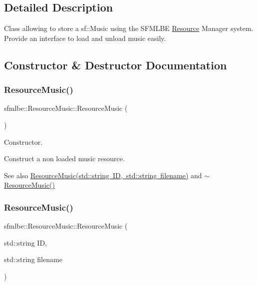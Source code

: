 \subsection{Detailed Description}
Class allowing to store a sf\+::\+Music using the S\+F\+M\+L\+BE \mbox{\hyperlink{classsfmlbe_1_1_resource}{Resource}} Manager system. Provide an interface to load and unload music easily. 

\subsection{Constructor \& Destructor Documentation}
\mbox{\label{classsfmlbe_1_1_resource_music_a9a20ebb5669632cbc4d85afb6ecf8848}} 
\subsubsection{\texorpdfstring{Resource\+Music()}{ResourceMusic()}\hspace{0.1cm}{\footnotesize\ttfamily [1/2]}}
{\footnotesize\ttfamily sfmlbe\+::\+Resource\+Music\+::\+Resource\+Music (\begin{DoxyParamCaption}{ }\end{DoxyParamCaption})}



Constructor. 

Construct a non loaded music resource. \begin{DoxySeeAlso}{See also}
\mbox{\hyperlink{classsfmlbe_1_1_resource_music_a31e4aa77dd956096604e3b939e3d2075}{Resource\+Music(std\+::string I\+D, std\+::string filename)}} and \mbox{\hyperlink{classsfmlbe_1_1_resource_music_a13f5a79c13b15951d855cad9224a1a7b}{$\sim$\+Resource\+Music()}} 
\end{DoxySeeAlso}
\mbox{\label{classsfmlbe_1_1_resource_music_a31e4aa77dd956096604e3b939e3d2075}} 
\subsubsection{\texorpdfstring{Resource\+Music()}{ResourceMusic()}\hspace{0.1cm}{\footnotesize\ttfamily [2/2]}}
{\footnotesize\ttfamily sfmlbe\+::\+Resource\+Music\+::\+Resource\+Music (\begin{DoxyParamCaption}\item[{std\+::string}]{ID,  }\item[{std\+::string}]{filename }\end{DoxyParamCaption})}




